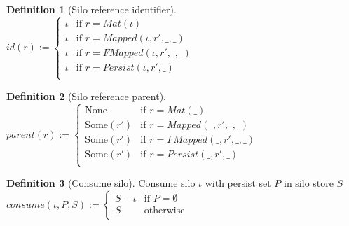 \documentclass{article}
\theoremstyle{definition}
\newtheorem{defn}{Definition}[section]
\newcommand{\None}{\text{None}}
\newcommand{\Some}[1]{\text{Some}(#1)}
\begin{document}
\begin{defn}[Silo reference identifier]
    $id(r) := \begin{cases}
    \iota  & \text{if } r = Mat(\iota) \\
    \iota  & \text{if } r = Mapped(\iota, r', \_, \_) \\
    \iota  & \text{if } r = FMapped(\iota, r', \_, \_) \\
    \iota  & \text{if } r = Persist(\iota, r', \_) \\
    \end{cases}$
\end{defn}

\begin{defn}[Silo reference parent]
    $parent(r) := \begin{cases}
    \None     & \text{if } r = Mat(\_) \\
    \Some{r'} & \text{if } r = Mapped(\_, r', \_, \_) \\
    \Some{r'} & \text{if } r = FMapped(\_, r', \_, \_) \\
    \Some{r'} & \text{if } r = Persist(\_, r', \_) \\
    \end{cases}$
\end{defn}

\begin{defn}[Consume silo]
Consume silo $\iota$ with persist set $P$ in silo store $S$ \\
  $consume(\iota, P, S) := \begin{cases}
  S - \iota & \text{if } P = \emptyset \\
  S         & \text{otherwise} \\
  \end{cases}$
\end{defn}

\newpage

%
%
\end{document}
